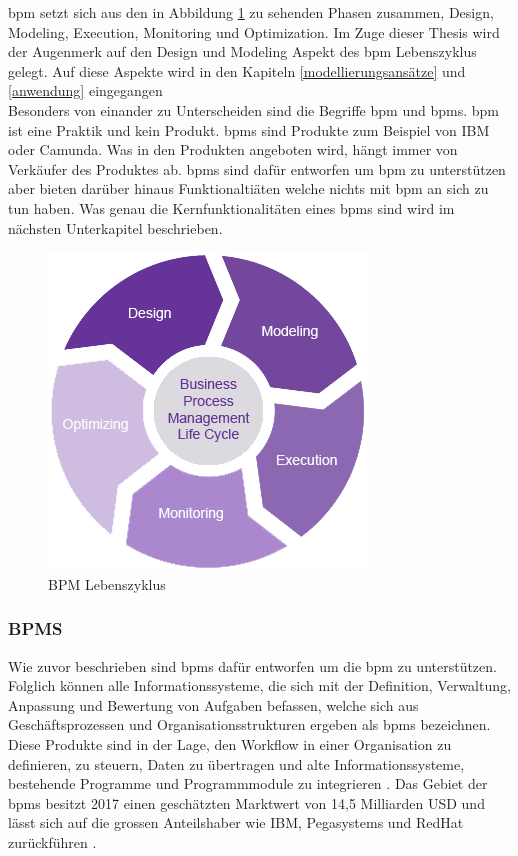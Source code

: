 \documentclass[a4paper, 12pt, twoside, headsepline=true]{scrartcl} %
\begin{document}
\ac{bpm} setzt sich aus den in Abbildung \ref{bpmlifecycle} zu sehenden Phasen zusammen, Design, Modeling, Execution, Monitoring und Optimization. Im Zuge dieser Thesis wird der Augenmerk auf den Design und Modeling Aspekt des \ac{bpm} Lebenszyklus gelegt. Auf diese Aspekte wird in den Kapiteln \ref{modellierungsansätze} und \ref{anwendung} eingegangen \\
Besonders von einander zu Unterscheiden sind die Begriffe \ac{bpm} und \ac{bpms}. \ac{bpm} ist eine Praktik und kein Produkt. \ac{bpms} sind Produkte zum Beispiel von IBM oder Camunda. Was in den Produkten angeboten wird, hängt immer von Verkäufer des Produktes ab. \ac{bpms} sind dafür entworfen um \ac{bpm} zu unterstützen aber bieten darüber hinaus Funktionaltiäten welche nichts mit \ac{bpm} an sich zu tun haben.
Was genau die Kernfunktionalitäten eines \ac{bpms} sind wird im nächsten Unterkapitel beschrieben.

\begin{figure}[H]
	\includegraphics[height=5.5 cm,keepaspectratio,center]{figures/BPMLifecycle}
	\caption{BPM Lebenszyklus \cite{bpmlifecycle}}
	\label{bpmlifecycle}
\end{figure}


\subsubsection{BPMS}
Wie zuvor beschrieben sind \ac{bpms} dafür entworfen um die \ac{bpm} zu unterstützen. Folglich können alle Informationssysteme, die sich mit der Definition, Verwaltung, Anpassung und Bewertung von Aufgaben befassen, welche sich aus Geschäftsprozessen und Organisationsstrukturen ergeben als \ac{bpms} bezeichnen. Diese Produkte sind in der Lage, den Workflow in einer Organisation zu definieren, zu steuern, Daten zu übertragen und alte Informationssysteme, bestehende Programme und Programmmodule zu integrieren \cite{bpms}. Das Gebiet der \ac{bpms} besitzt 2017 einen geschätzten Marktwert von 14,5 Milliarden USD und lässt sich auf die grossen Anteilshaber wie IBM, Pegasystems und RedHat zurückführen \cite{bpmsmarket}.
\end{document}
